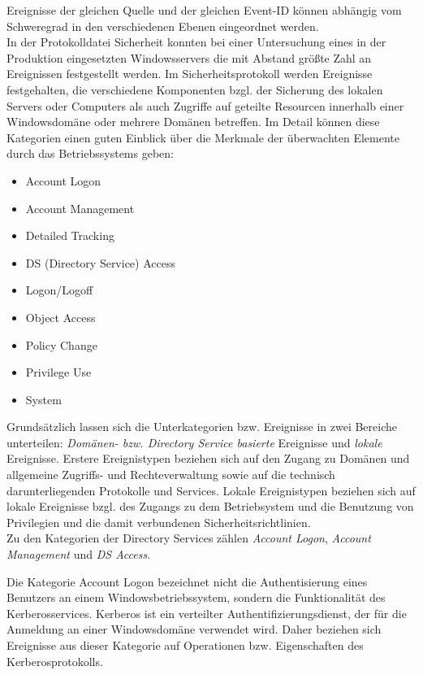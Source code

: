 Ereignisse der gleichen Quelle und der gleichen Event-ID können abhängig vom Schweregrad in den verschiedenen Ebenen eingeordnet werden.\\


In der Protokolldatei \glqq Sicherheit\grqq{} konnten bei einer Untersuchung eines in der Produktion eingesetzten Windowsservers die mit Abstand größte Zahl an Ereignissen festgestellt werden. Im Sicherheitsprotokoll werden Ereignisse festgehalten, die verschiedene Komponenten bzgl. der Sicherung des lokalen Servers oder Computers als auch Zugriffe auf geteilte Resourcen innerhalb einer Windowsdomäne oder mehrere Domänen betreffen. Im Detail können diese Kategorien einen guten Einblick über die Merkmale der überwachten Elemente durch das Betriebssystems geben:
\begin{itemize}
\item Account Logon
\item Account Management
\item Detailed Tracking
\item DS (Directory Service) Access
\item Logon/Logoff
\item Object Access
\item Policy Change
\item Privilege Use
\item System
\end{itemize}
Grundsätzlich lassen sich die Unterkategorien bzw. Ereignisse in zwei Bereiche unterteilen: \textit{Domänen- bzw. Directory Service basierte} Ereignisse und \textit{lokale} Ereignisse. Erstere Ereignistypen beziehen sich auf den Zugang zu Domänen und allgemeine Zugriffs- und Rechteverwaltung sowie auf die technisch darunterliegenden Protokolle und Services. Lokale Ereignistypen beziehen sich auf lokale Ereignisse bzgl. des Zugangs zu dem Betriebsystem und die Benutzung von Privilegien und die damit verbundenen Sicherheitsrichtlinien\citep{MS3}. \\

Zu den Kategorien der Directory Services zählen \textit{Account Logon}, \textit{Account Management} und \textit{DS Access}.

Die Kategorie \glqq Account Logon\grqq{} bezeichnet nicht die Authentisierung eines Benutzers an einem Windowsbetriebssystem, sondern die Funktionalität des Kerberosservices. Kerberos ist ein verteilter Authentifizierungsdienst, der für die Anmeldung an einer Windowsdomäne verwendet wird.  Daher beziehen sich Ereignisse aus dieser Kategorie auf Operationen bzw. Eigenschaften des Kerberosprotokolls. 

